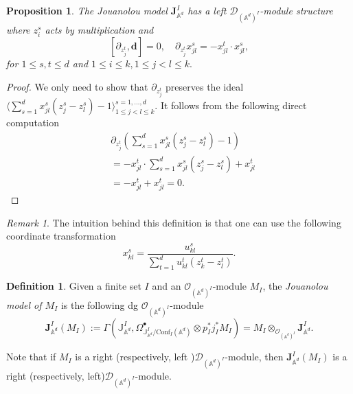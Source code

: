 \documentclass[11pt]{amsart}
\newtheorem{prop}[thm]{Proposition}
\theoremstyle{definition}
\newtheorem{defn}[thm]{Definition}
\theoremstyle{remark}
\newtheorem{rem}[thm]{Remark}
\numberwithin{equation}{section}
\begin{document}
\begin{prop}\label{prop:dmodulestr}
    The Jouanolou model $\mathbf{J}_{\mathbb{A}^d}^{{I}}$ has a left $\mathcal{D}_{(\mathbb{A}^d)^{{I}}}$-module
    structure where $z^s_i$ acts by multiplication and
    \[
   [\partial_{z^t_j},\mathbf{d}]=0 , \quad \partial_{z^t_j}x^s_{jl}=-x^t_{jl}\cdot x^s_{jl}, 
 \]
for $1\leq s,t\leq d$ and  $1\leq i\leq k, 1\leq j<l\leq k.$
\end{prop}
\begin{proof}
We only need to show that $\partial_{z^t_j}$ preserves the ideal $\langle \sum\limits_{s=1}^dx^s_{jl}(z^s_j-z^s_l)-1\rangle^{s=1,\dots,d}_{1\leq j<l\leq k}$. It follows from the following direct computation
\begin{align*}
   & \partial_{z^t_j} \left(\sum\limits_{s=1}^dx^s_{jl}(z^s_j-z^s_l)-1\right)\\
   & =-x^t_{jl}\cdot\sum\limits_{s=1}^dx^s_{jl}(z^s_j-z^s_l)+x^t_{jl}\\
   &=-x^t_{jl}+x^t_{jl}=0.
\end{align*}

\end{proof}
\begin{rem}
    The intuition behind this definition is that one can use the following coordinate transformation
    $$
    x^s_{kl}=\frac{u^s_{kl}}{\sum\limits^d_{t=1}u^t_{kl}(z^t_k-z^t_l)}.
    $$
\end{rem}

\begin{defn}\label{dfn:jmodel}
Given a finite set ${I}$ and an $\mathcal{O}_{(\mathbb{A}^d)^{{I}}}$-module $M_{{I}}$, the \textit{Jouanolou model of
$M_{{I}}$} is the following dg $\mathcal{O}_{(\mathbb{A}^d)^{{I}}}$-module
\[
\mathbf{J}_{\mathbb{A}^d}^{{I}}(M_{{I}}):=\Gamma\left(\mathbb{J}_{\mathbb{A}^d}^{{I}},\Omega^{\bullet}_{\mathbb{J}_{\mathbb{A}^d}^{{I}}/\mathrm{Conf}_{{I}}(\mathbb{A}^d)}\otimes p^*_{{I}}j^*_{{I}}M_{{I}} \right)=M_{{I}}\otimes_{\mathcal{O}_{(\mathbb{A}^d)^{{I}}}}\mathbf{J}_{\mathbb{A}^d}^{{I}}.
\]

Note that if $M_{{I}}$ is a right (respectively, left )$\mathcal{D}_{(\mathbb{A}^d)^{{I}}}$-module, then $\mathbf{J}
_{\mathbb{A}^d}^{{I}}(M_{{I}})$ is a right (respectively, left)$\mathcal{D}_{(\mathbb{A}^d)^{{I}}}$-module.
\end{defn}
\end{document}

